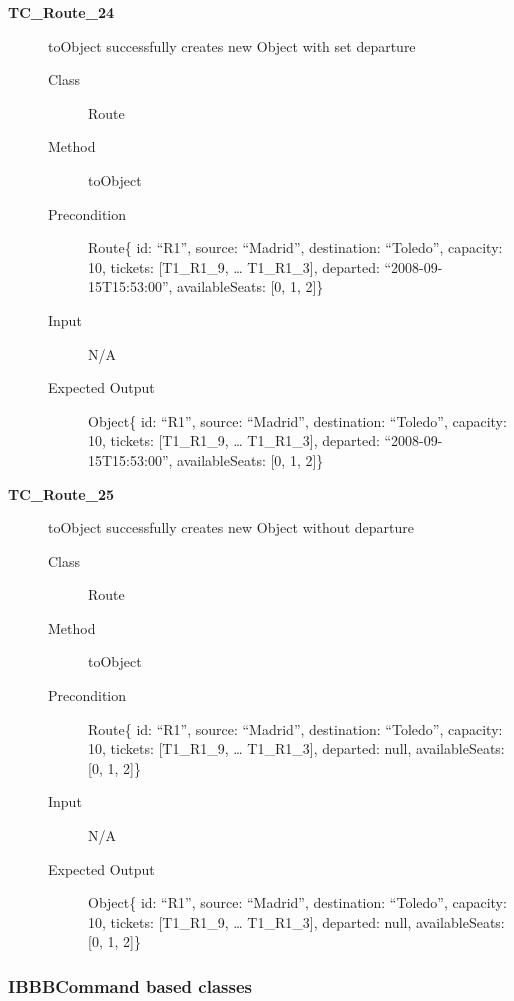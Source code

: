 \documentclass[11pt]{article}
\begin{document}
\begin{description}
\item[{\textbf{TC\_Route\_24}}] toObject successfully creates new Object with set departure
\begin{description}
\item[{Class}] Route
\item[{Method}] toObject
\item[{Precondition}] Route\{ id: “R1”, source: “Madrid”, destination: “Toledo”, capacity: 10,  tickets: [T1\_R1\_9, … T1\_R1\_3], departed: “2008-09-15T15:53:00”, availableSeats: [0, 1, 2]\}
\item[{Input}] N/A
\item[{Expected Output}] Object\{ id: “R1”, source: “Madrid”, destination: “Toledo”, capacity: 10,  tickets: [T1\_R1\_9, … T1\_R1\_3], departed: “2008-09-15T15:53:00”, availableSeats: [0, 1, 2]\}
\end{description}

\item[{\textbf{TC\_Route\_25}}] toObject successfully creates new Object without departure
\begin{description}
\item[{Class}] Route
\item[{Method}] toObject
\item[{Precondition}] Route\{ id: “R1”, source: “Madrid”, destination: “Toledo”, capacity: 10,  tickets: [T1\_R1\_9, … T1\_R1\_3], departed: null, availableSeats: [0, 1, 2]\}
\item[{Input}] N/A
\item[{Expected Output}] Object\{ id: “R1”, source: “Madrid”, destination: “Toledo”, capacity: 10,  tickets: [T1\_R1\_9, … T1\_R1\_3], departed: null, availableSeats: [0, 1, 2]\}
\end{description}
\end{description}

\subsubsection{IBBBCommand based classes}
\label{sec:org27b00cc}
\end{document}
